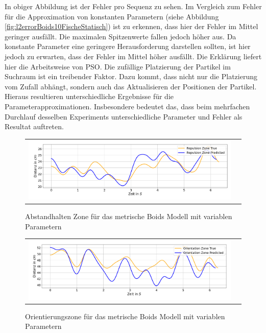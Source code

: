 In obiger Abbildung ist der Fehler pro Sequenz zu sehen. Im Vergleich zum Fehler für die Approximation von konstanten Parametern (siehe Abbildung \ref{fig:l2errorBoids10FischeStatisch}) ist zu erkennen, dass hier der Fehler im Mittel geringer ausfällt.
Die maximalen Spitzenwerte fallen jedoch höher aus. Da konstante Parameter eine geringere Herausforderung darstellen sollten, ist hier jedoch zu erwarten, dass der Fehler im Mittel höher ausfällt. Die Erklärung liefert hier die Arbeitsweise von PSO. Die zufällige Platzierung der Partikel im Suchraum ist ein treibender Faktor. Dazu kommt, dass nicht nur die Platzierung vom Zufall abhängt, sondern auch das Aktualisieren der Positionen der Partikel. Hieraus resultieren unterschiedliche Ergebnisse für die Parameterapproximationen. Insbesondere bedeutet das, dass beim mehrfachen Durchlauf desselben Experiments unterschiedliche Parameter und Fehler als Resultat auftreten.
\begin{figure}[H]
\centering
\begin{tabular}{cc}
\includegraphics[width=1.0\textwidth]{figures/Experimente/Parameter_variabel/Boids_R.png} 
\end{tabular}
\caption{Abstandhalten Zone für das metrische Boids Modell mit variablen Parametern  \label{fig:Boids_PV_R}}
\end{figure}

\begin{figure}[H]
\centering
\begin{tabular}{cc}
\includegraphics[width=1.0\textwidth]{figures/Experimente/Parameter_variabel/Boids_O.png} 
\end{tabular}
\caption{Orientierungszone für das metrische Boids Modell mit variablen Parametern \label{fig:Boids_PV_O}}
\end{figure}

